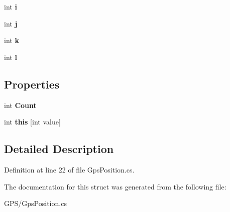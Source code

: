 \begin{DoxyCompactItemize}
\item 
\hypertarget{struct_g_p_s_mobile_1_1_satellite_array_aad410a87467633a400ac6864dafc9c44}{
int {\bfseries i}}
\label{struct_g_p_s_mobile_1_1_satellite_array_aad410a87467633a400ac6864dafc9c44}

\item 
\hypertarget{struct_g_p_s_mobile_1_1_satellite_array_a84d7ef86dded1467558e8fe1558b592c}{
int {\bfseries j}}
\label{struct_g_p_s_mobile_1_1_satellite_array_a84d7ef86dded1467558e8fe1558b592c}

\item 
\hypertarget{struct_g_p_s_mobile_1_1_satellite_array_a215e179e7a20ac13b74b4d7f616d45cb}{
int {\bfseries k}}
\label{struct_g_p_s_mobile_1_1_satellite_array_a215e179e7a20ac13b74b4d7f616d45cb}

\item 
\hypertarget{struct_g_p_s_mobile_1_1_satellite_array_a3d547750c6d5c0735342dcfae32d035a}{
int {\bfseries l}}
\label{struct_g_p_s_mobile_1_1_satellite_array_a3d547750c6d5c0735342dcfae32d035a}

\end{DoxyCompactItemize}
\subsection*{Properties}
\begin{DoxyCompactItemize}
\item 
\hypertarget{struct_g_p_s_mobile_1_1_satellite_array_a59a9366eb3fbe63e760f832ebb3ee203}{
int {\bfseries Count}}
\label{struct_g_p_s_mobile_1_1_satellite_array_a59a9366eb3fbe63e760f832ebb3ee203}

\item 
\hypertarget{struct_g_p_s_mobile_1_1_satellite_array_aef10f93c6bfc6fc95ef4074bca1fe32c}{
int {\bfseries this} \mbox{[}int value\mbox{]}}
\label{struct_g_p_s_mobile_1_1_satellite_array_aef10f93c6bfc6fc95ef4074bca1fe32c}

\end{DoxyCompactItemize}


\subsection{Detailed Description}


Definition at line 22 of file GpsPosition.cs.

The documentation for this struct was generated from the following file:\begin{DoxyCompactItemize}
\item 
GPS/GpsPosition.cs\end{DoxyCompactItemize}
